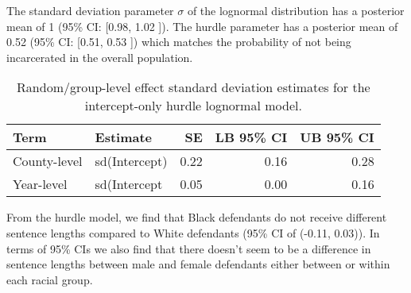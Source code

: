 \documentclass[
  letterpaper,
  DIV=11,
  numbers=noendperiod]{scrartcl}
\begin{document}
The standard deviation parameter \(\sigma\) of the lognormal
distribution has a posterior mean of 1 (95\% CI: {[}0.98, 1.02 {]}). The
hurdle parameter has a posterior mean of 0.52 (95\% CI: {[}0.51, 0.53
{]}) which matches the probability of not being incarcerated in the
overall population.

\hypertarget{tbl-brms1-group-eff}{}
\begin{table}
\caption{\label{tbl-brms1-group-eff}Random/group-level effect standard deviation estimates for the
intercept-only hurdle lognormal model. }\tabularnewline

\centering
\begin{tabular}{l|l|r|r|r}
\hline
Term & Estimate & SE & LB 95\% CI & UB 95\% CI\\
\hline
County-level & sd(Intercept) & 0.22 & 0.16 & 0.28\\
\hline
Year-level & sd(Intercept & 0.05 & 0.00 & 0.16\\
\hline
\end{tabular}
\end{table}

From the hurdle model, we find that Black defendants do not receive
different sentence lengths compared to White defendants (95\% CI of
(-0.11, 0.03)). In terms of 95\% CIs we also find that there doesn't
seem to be a difference in sentence lengths between male and female
defendants either between or within each racial group.
\end{document}
